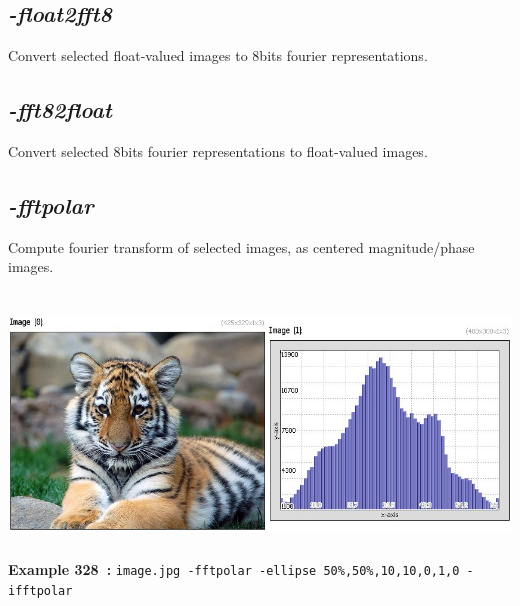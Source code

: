 \documentclass[a4paper,11pt,twoside]{book}
\begin{document}
\subsection{\emph{-float2fft8} }\vspace*{-0.5em}
Convert selected float-valued images to 8bits fourier representations.


\subsection{\emph{-fft82float} }\vspace*{-0.5em}
Convert selected 8bits fourier representations to float-valued images.


\subsection{\emph{-fftpolar} }\vspace*{-0.5em}
Compute fourier transform of selected images, as centered magnitude/phase images.
\begin{center}\includegraphics[keepaspectratio=true,height=7cm,width=\textwidth]{img/gmic_def328.jpg}\\
{\footnotesize \textbf{Example 328~:} \texttt{image.jpg -fftpolar -ellipse 50\%,50\%,10,10,0,1,0 -ifftpolar}}
\end{center}
\end{document}
